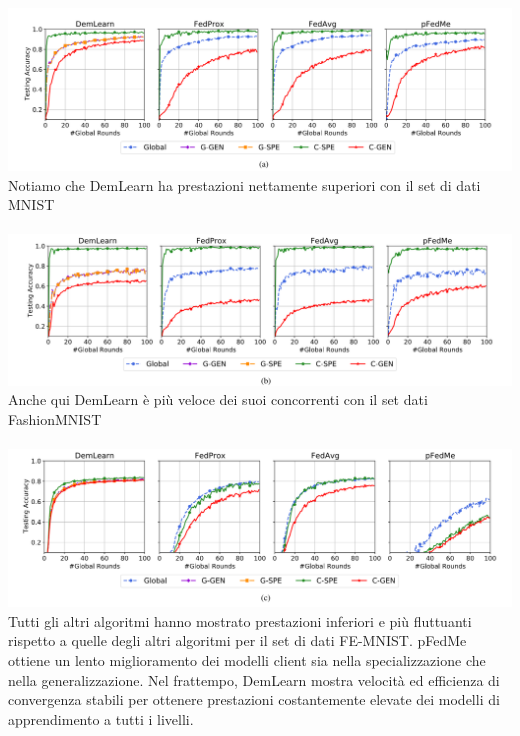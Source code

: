 \includegraphics[scale=0.3]{DemLearnMNIST}
 \vspace{0.5cm}
Notiamo che DemLearn ha prestazioni nettamente superiori con il set di dati MNIST\\\\

\includegraphics[scale=0.3]{DemLearnFashionMNIST}
\vspace{0.5cm}
Anche qui DemLearn è più veloce dei suoi concorrenti con il set dati FashionMNIST\\\\

\includegraphics[scale=0.3]{DemLearnFederatedExtMNIST}
 \vspace{0.5cm}
Tutti gli altri algoritmi hanno mostrato prestazioni inferiori e più fluttuanti rispetto a quelle degli altri algoritmi per il set di dati FE-MNIST. pFedMe ottiene un lento miglioramento dei modelli client sia nella specializzazione che nella generalizzazione. Nel frattempo, DemLearn mostra velocità ed efficienza di convergenza stabili per ottenere prestazioni costantemente elevate dei modelli di apprendimento a tutti i livelli.\\\\

